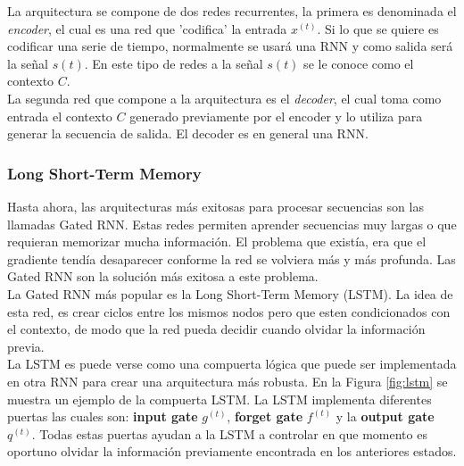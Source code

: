     La arquitectura se compone de dos redes recurrentes, la primera es denominada el \textit{encoder}, el cual es una red que 'codifica' la entrada $x^{(t)}$. Si lo que se quiere es codificar una serie de tiempo, normalmente se usará una RNN y como salida será la señal $s(t)$. En este tipo de redes a la señal $s(t)$ se le conoce como el contexto $C$. \\
    
    La segunda red que compone a la arquitectura es el \textit{decoder}, el cual toma como entrada el contexto $C$ generado previamente por el encoder y lo utiliza para generar la secuencia de salida. El decoder es en general una RNN.
    
    \subsubsection{Long Short-Term Memory}
   	Hasta ahora, las arquitecturas más exitosas para procesar secuencias son las llamadas Gated RNN. Estas redes permiten aprender secuencias muy largas o que requieran memorizar mucha información. El problema que existía, era que el gradiente tendía desaparecer conforme la red se volviera más y más profunda. Las Gated RNN son la solución más exitosa a este problema. \\
   	
   	La Gated RNN más popular es la Long Short-Term Memory (LSTM). La idea de esta red, es crear ciclos entre los mismos nodos pero que esten condicionados con el contexto, de modo que la red pueda decidir cuando olvidar la información previa. \\
   	
   	La LSTM es puede verse como una compuerta lógica que puede ser implementada en otra RNN para crear una arquitectura más robusta. En la Figura \ref{fig:lstm} se muestra un ejemplo de la compuerta LSTM. La LSTM implementa diferentes puertas las cuales son: \textbf{input gate} $g^{(t)}$, \textbf{forget gate} $f^{(t)}$ y la \textbf{output gate} $q^{(t)}$. Todas estas puertas ayudan a la LSTM a controlar en que momento es oportuno olvidar la información previamente encontrada en los anteriores estados. \\
   	
